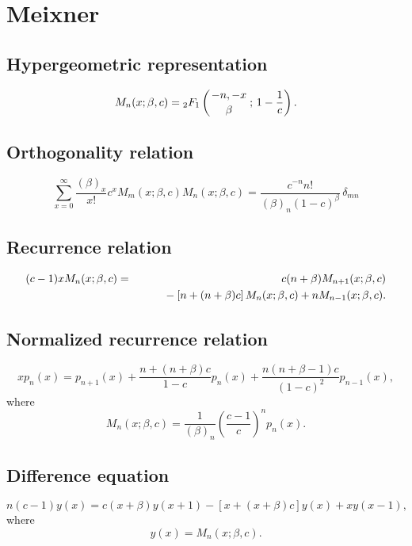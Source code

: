 \documentclass[envcountchap,graybox]{svmono}
\newcommand{\hyp}[5]{\mbox{}_{#1}{F}_{#2}
\left(\genfrac{}{}{0pt}{}{#3}{#4}\,;\,#5\right)}
\newcommand{\mathindent}{\hspace{7.5mm}}
\begin{document}
\section{Meixner}

\par\setcounter{equation}{0}

\subsection*{Hypergeometric representation}
\begin{equation}
\label{DefMeixner}
M_n(x;\beta,c)=\hyp{2}{1}{-n,-x}{\beta}{1-\frac{1}{c}}.
\end{equation}

\subsection*{Orthogonality relation}
\begin{equation}
\label{OrtMeixner}
\sum_{x=0}^{\infty}\frac{(\beta)_x}{x!}c^xM_m(x;\beta,c)M_n(x;\beta,c)
{}=\frac{c^{-n}n!}{(\beta)_n(1-c)^{\beta}}\,\delta_{mn}
\end{equation}

\subsection*{Recurrence relation}
\begin{eqnarray}
\label{RecMeixner}
(c-1)xM_n(x;\beta,c)&=&c(n+\beta)M_{n+1}(x;\beta,c)\nonumber\\
& &{}\mathindent{}-\left[n+(n+\beta)c\right]M_n(x;\beta,c)+nM_{n-1}(x;\beta,c).
\end{eqnarray}

\subsection*{Normalized recurrence relation}
\begin{equation}
\label{NormRecMeixner}
xp_n(x)=p_{n+1}(x)+\frac{n+(n+\beta)c}{1-c}p_n(x)+
\frac{n(n+\beta-1)c}{(1-c)^2}p_{n-1}(x),
\end{equation}
where
$$M_n(x;\beta,c)=\frac{1}{(\beta)_n}\left(\frac{c-1}{c}\right)^np_n(x).$$

\subsection*{Difference equation}
\begin{equation}
\label{dvMeixner}
n(c-1)y(x)=c(x+\beta)y(x+1)-\left[x+(x+\beta)c\right]y(x)+xy(x-1),
\end{equation}
where
$$y(x)=M_n(x;\beta,c).$$
\end{document}
